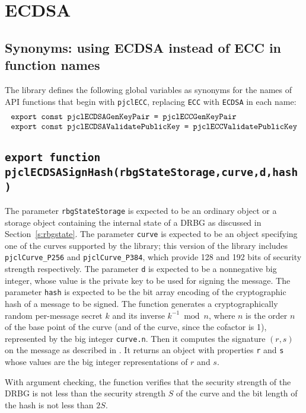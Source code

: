 \documentclass[12pt]{article}
\begin{document}
\section{ECDSA}

\subsection{Synonyms: using ECDSA instead of ECC in function names}

The library defines the following global variables as 
synonyms for the names of API functions that begin with {\tt pjclECC},
replacing {\tt ECC} with {\tt ECDSA} in each name:
$$
\begin{array}{l}
\mbox{\tt export const pjclECDSAGenKeyPair = pjclECCGenKeyPair}\\
\mbox{\tt export const pjclECDSAValidatePublicKey = pjclECCValidatePublicKey}
\end{array}
$$

\subsection{\tt export function pjclECDSASignHash(rbgStateStorage,curve,d,hash)}

The parameter {\tt rbgStateStorage} is expected to be an ordinary
object or a storage object containing the internal state of a DRBG 
as discussed in Section~\ref{s:rbgstate}.
The parameter {\tt curve} is expected to be an object specifying one of the curves supported by the library;
this version of the library includes {\tt pjclCurve\_P256} and {\tt pjclCurve\_P384}, which provide
128 and 192 bits of security strength respectively.
The parameter {\tt d} is expected to be a nonnegative big integer, whose value is the private key
to be used for signing the message.
The parameter {\tt hash} is expected to be the bit array encoding of the
cryptographic hash of a message to be signed.  The function 
generates a cryptographically random per-message secret $k$ and its inverse $k^{-1} \bmod n$, 
where $n$ is the order $n$ of the base point of the curve (and of the curve, since the cofactor is 1),
represented by the big integer {\tt curve.n}.  Then it 
computes the signature $(r,s)$ on the message as described in \cite[Section~6.4]{DSS-4}.
It returns an object
with properties {\tt r} and {\tt s} whose values are the big integer representations 
of $r$ and $s$.

With argument checking, the function verifies that the security strength of the DRBG
is not less than the security strength $S$ of the curve and the 
bit length of the hash is not less than $2S$.
\end{document}
